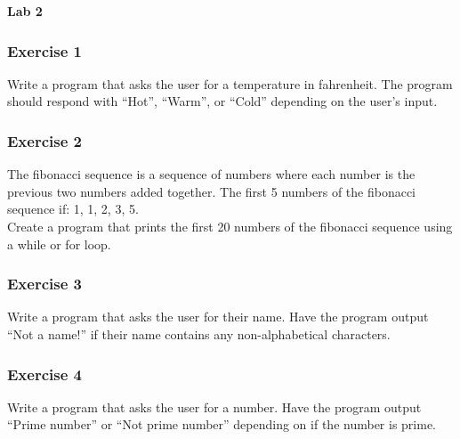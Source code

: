 \documentclass[a4paper,12pt]{article}
\begin{document}
\lstset{frame=single,basicstyle=\ttfamily,tabsize=4}

{\centering
\large \bf
Lab 2
}

\subsubsection*{Exercise 1}
Write a program that asks the user for a temperature in fahrenheit. The program should respond with ``Hot'', ``Warm'', or ``Cold'' depending on the user's input.

\subsubsection*{Exercise 2}
 
The fibonacci sequence is a sequence of numbers where each number is the previous two numbers added together. The first 5 numbers of the fibonacci sequence if: 1, 1, 2, 3, 5. \\

Create a program that prints the first 20 numbers of the fibonacci sequence using a while or for loop.

\subsubsection*{Exercise 3}
Write a program that asks the user for their name. Have the program output ``Not a name!'' if their name contains any non-alphabetical characters.

\subsubsection*{Exercise 4}
Write a program that asks the user for a number. Have the program output ``Prime number'' or ``Not prime number'' depending on if the number is prime.
\end{document}
